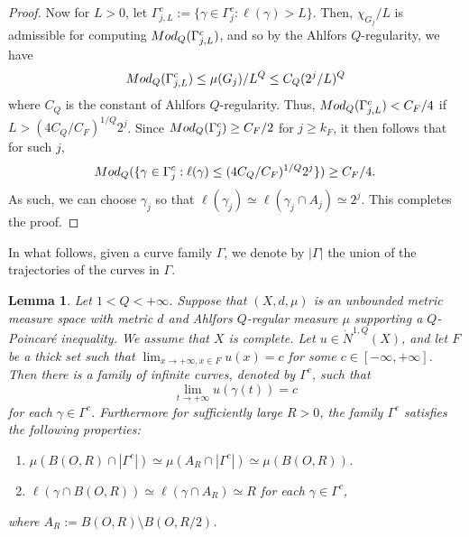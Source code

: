 \documentclass[10pt]{amsart}
\newtheorem{lemma}[theorem]{Lemma}
\numberwithin{equation}{section}
\newcommand{\Mod}{{\rm Mod}}
\begin{document}
\begin{proof}
 Now for $L>0$, let $\Gamma^c_{j,L}:=\{\gamma\in\Gamma^c_j:\ell (\gamma)>L\}$.  Then, $\chi_{G_j}/L$ is admissible for computing $\Mod_Q(\Gamma_{j,L}^c)$, and so by the Ahlfors $Q$-regularity, we have 
\[
\Mod_Q(\Gamma^c_{j,L})\le\mu(G_j)/L^Q\le C_{Q}(2^j/L)^Q
\]
where $C_{Q}$ is the constant of Ahlfors $Q$-regularity.  Thus, 
$\Mod_Q(\Gamma^c_{j,L})<C_F/4$
if $L>(4C_{Q}/C_F)^{1/Q}2^j$.  Since $\Mod_Q(\Gamma^c_j)\ge C_F/2$ for $j\ge k_F$, it then follows that for such $j$, 
\begin{equation}\label{eq3.19-0307}
\Mod_Q(\{\gamma\in\Gamma_j^c:\ell(\gamma)\le(4C_{Q}/C_F)^{1/Q}2^j\})\ge C_F/4.
\end{equation}
As such, we can choose $\gamma_j$ so that $\ell(\gamma_j)\simeq \ell(\gamma_j\cap A_j)\simeq 2^j$. This completes the proof.
\end{proof}
In what follows, given a curve family $\Gamma$, we denote by $|\Gamma|$ the union of the trajectories of the curves in $\Gamma$.
\begin{lemma}
\label{lem5.3-0709} 
Let  $1<Q<+\infty$. 
Suppose that $(X,d,\mu)$ is an  unbounded metric measure space with metric $d$ and Ahlfors $Q$-regular measure $\mu$ supporting a $Q$-Poincar\'e inequality. We assume that $X$ is complete.  Let $u\in \dot N^{1,Q}(X)$, and let $F$ be a thick set such that $\lim_{x\to +\infty,x\in F}u(x)=c$ for some $c\in[-\infty,+\infty]$. Then there is a family  of infinite curves, denoted by $\Gamma^c$, such that \[
\lim_{t\to+\infty}u(\gamma(t))=c
\] for each $\gamma\in\Gamma^c$.  Furthermore for sufficiently large $R>0$, 
the family $\Gamma^c$ satisfies the following properties:
\begin{enumerate}
    \item [{\rm 1.}] $ \mu(B(O,R)\cap|\Gamma^c|)\simeq \mu(A_R\cap |\Gamma^c|)\simeq\mu(B(O,R))$.
     \item [{\rm 2.}] $\ell(\gamma\cap B(O,R))\simeq \ell(\gamma\cap A_R)\simeq R$ for each $\gamma\in\Gamma^c$,
\end{enumerate}
where $A_R:=B(O,R)\setminus B(O,R/2)$.
\end{lemma}
\end{document}
